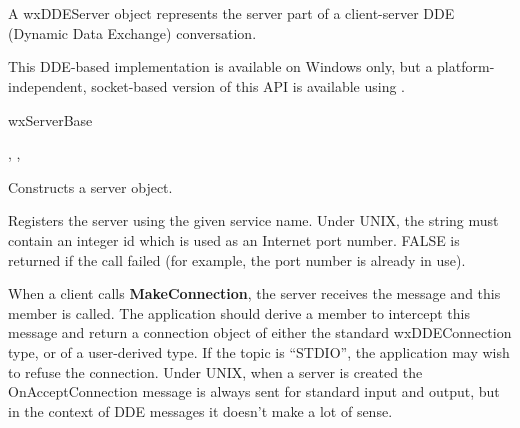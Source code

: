 \section{}\label{wxddeserver}

A wxDDEServer object represents the server part of a client-server DDE
(Dynamic Data Exchange) conversation.

This DDE-based implementation is
available on Windows only, but a platform-independent, socket-based version
of this API is available using .


wxServerBase


, , 




Constructs a server object.



Registers the server using the given service name. Under UNIX, the
string must contain an integer id which is used as an Internet port
number. FALSE is returned if the call failed (for example, the port
number is already in use).

\label{wxddeserveronacceptconnection}


When a client calls {\bf MakeConnection}, the server receives the
message and this member is called. The application should derive a
member to intercept this message and return a connection object of
either the standard wxDDEConnection type, or of a user-derived type. If the
topic is ``STDIO'', the application may wish to refuse the connection.
Under UNIX, when a server is created the OnAcceptConnection message is
always sent for standard input and output, but in the context of DDE
messages it doesn't make a lot of sense.


